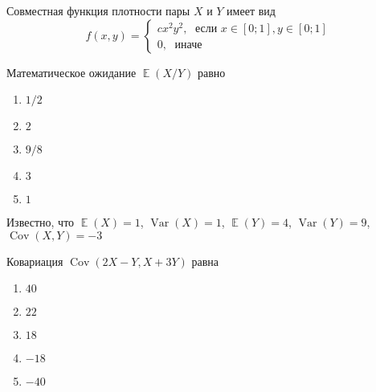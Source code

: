 \documentclass[t]{beamer}
\DeclareMathOperator{\Var}{Var}
\DeclareMathOperator{\Cov}{Cov}
\DeclareMathOperator{\E}{\mathbb{E}}
\begin{document}
 \begin{frame} \label{23} 
\begin{block}{23} 

Совместная функция плотности пары $X$ и $Y$ имеет вид
\[
f(x,y)=\begin{cases}
cx^2y^2, \; \text{ если } x\in[0;1], y\in [0;1] \\
0, \; \text{ иначе}
\end{cases}
\]

\vspace{0.5cm} 
 
 
Математическое ожидание $\E(X/Y)$ равно
 


 \end{block} 
\begin{enumerate} 
\item[] \hyperlink{23-No}{\beamergotobutton{} $1/2$}
\item[] \hyperlink{23-No}{\beamergotobutton{} $2$
}
\item[] \hyperlink{23-Yes}{\beamergotobutton{} $9/8$}
\item[] \hyperlink{23-No}{\beamergotobutton{} $3$}
\item[] \hyperlink{23-No}{\beamergotobutton{} $1$}
\end{enumerate} 
\end{frame} 


 \begin{frame} \label{24} 
\begin{block}{24} 

Известно, что $\E(X)=1$, $\Var(X)=1$, $\E(Y)=4$, $\Var(Y)=9$, $\Cov(X,Y)=-3$

\vspace{0.5cm} 
 
 
Ковариация $\Cov(2X-Y,X+3Y)$ равна
 


 \end{block} 
\begin{enumerate} 
\item[] \hyperlink{24-No}{\beamergotobutton{} $40$}
\item[] \hyperlink{24-No}{\beamergotobutton{} $22$}
\item[] \hyperlink{24-No}{\beamergotobutton{} $18$
}
\item[] \hyperlink{24-No}{\beamergotobutton{} $-18$}
\item[] \hyperlink{24-Yes}{\beamergotobutton{} $-40$}
\end{enumerate} 
\end{frame} 
\end{document}
